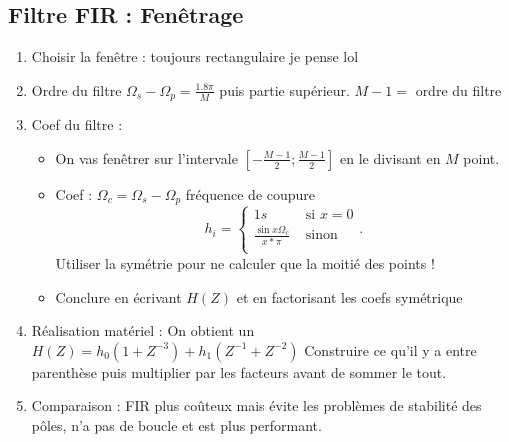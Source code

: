 \documentclass[9pt]{article}
\begin{document}
\begin{multicols}{2}
\subsection{Filtre FIR : Fenêtrage}
\begin{enumerate}
    \item Choisir la fenêtre : toujours rectangulaire je pense lol
    \item Ordre du filtre $ \Omega _s - \Omega _p = \frac{1.8 \pi }{M} $ puis partie supérieur. $ M - 1 =  $ ordre du filtre
    \item Coef du filtre : \begin{itemize}
        \item On vas fenêtrer sur l'intervale $ [-\frac{M-1}{2} ; \frac{M-1}{2}] $ en le divisant en $ M $ point.
        \item Coef : $ \Omega _c = \Omega _s - \Omega _p $ fréquence de coupure 
        \[
            h_i = \begin{cases}
                1s &\text{ si } x = 0\\
                \frac{\sin x \Omega _c}{x*\pi } &\text{ sinon}\\
                \end{cases}  
        .\]
        Utiliser la symétrie pour ne calculer que la moitié des points !
        \item Conclure en écrivant $ H(Z) $ et en factorisant les coefs symétrique
    \end{itemize}
    \item Réalisation matériel : On obtient un $ H(Z) = h_0(1+Z^{-3}) + h_1 (Z^{-1} + Z^{-2})$ Construire ce qu'il y a entre parenthèse puis multiplier par les facteurs avant de sommer le tout.
    \item Comparaison : FIR plus coûteux mais évite les problèmes de stabilité des pôles, n'a pas de boucle et est plus performant.
\end{enumerate}

\end{multicols}
\end{document}
